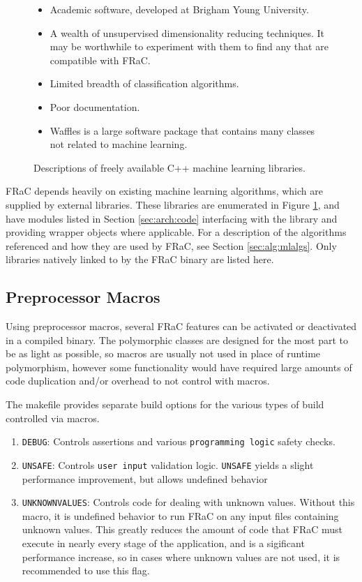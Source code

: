 \documentclass{article}
\newcommand{\macro}[1]{\texttt{\color{macro}#1}}
\newcommand*\iminus{\item[\textcolor{bad}{\textbf{--}}]} %
\newcommand*\ineutral{\item[\textcolor{neutral}{$\mathbf{\sim}$}]}
\begin{document}
\begin{multicols}{2}
\begin{figure}
\begin{itemize}
\begin{itemize}
\ineutral Academic software, developed at Brigham Young University.

\ineutral A wealth of unsupervised dimensionality reducing techniques.  \textcolor{reach}{It may be worthwhile to experiment with them to find any that are compatible with FRaC.}

\iminus Limited breadth of classification algorithms.

\iminus Poor documentation.

\iminus Waffles is a large software package that contains many classes not related to machine learning.

\end{itemize}
\end{itemize}

\caption{Descriptions of freely available C++ machine learning libraries.}
\label{fig:lib}
\end{figure}

FRaC depends heavily on existing machine learning algorithms, which are supplied by external libraries.  These libraries are enumerated in Figure \ref{fig:lib}, and have modules listed in Section \ref{sec:arch:code} interfacing with the library and providing wrapper objects where applicable.  For a description of the algorithms referenced and how they are used by FRaC, see Section \ref{sec:alg:mlalgs}.  Only libraries natively linked to by the FRaC binary are listed here.

\subsection{Preprocessor Macros}

Using preprocessor macros, several FRaC features can be activated or deactivated in a compiled binary.  The polymorphic classes are designed for the most part to be as light as possible, so macros are usually not used in place of runtime polymorphism, however some functionality would have required large amounts of code duplication and/or overhead to not control with macros.

The makefile provides separate build options for the various types of build controlled via macros.

\begin{enumerate}

\item \macro{DEBUG}: Controls assertions and various \macro{programming logic} safety checks.
\item \macro{UNSAFE}: Controls \macro{user input} validation logic. \texttt{UNSAFE} yields a slight performance improvement, but allows undefined behavior 
\item \macro{UNKNOWNVALUES}: Controls code for dealing with unknown values.  Without this macro, it is undefined behavior to run FRaC on any input files containing unknown values.  This greatly reduces the amount of code that FRaC must execute in nearly every stage of the application, and is a sigificant performance increase, so in cases where unknown values are not used, it is recommended to use this flag.


\end{enumerate}
\end{multicols}
\end{document}
